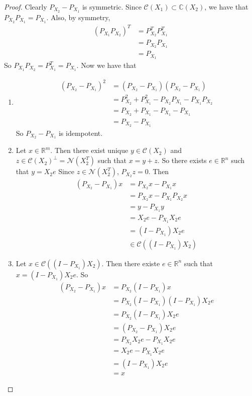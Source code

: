 \documentclass[12pt]{amsart}
\newcommand{\C}{\mathbb{C}}
\newcommand{\R}{\mathbb{R}}
\newcommand{\MC}{\mathcal{C}}
\newcommand{\MN}{\mathcal{N}}
\begin{document}
\begin{proof}
Clearly $P_{X_2} - P_{X_1}$ is symmetric. Since $\MC(X_1) \subset \C(X_2)$, we have that $P_{X_2}P_{X_1} = P_{X_1}$. Also, by symmetry, 
\begin{align*}
(P_{X_1}P_{X_2})^T 
&= P_{X_2}^TP_{X_1}^T \\
&= P_{X_2}P_{X_1} \\
&= P_{X_1} 
\end{align*} 
So $P_{X_1}P_{X_2} = P_{X_1}^T = P_{X_1}$. Now we have that
\begin{enumerate}
\item 
\begin{align*}
(P_{X_2} - P_{X_1})^2
&= (P_{X_2} - P_{X_1})(P_{X_2} - P_{X_1}) \\
&= P_{X_2}^2 + P_{X_1}^2 - P_{X_2}P_{X_1} - P_{X_1}P_{X_2} \\
&= P_{X_2} + P_{X_1} - P_{X_1} - P_{X_1} \\
&= P_{X_2} - P_{X_1}
\end{align*}
So $P_{X_2} - P_{X_1}$ is idempotent.
\item Let $x \in \R^m$. Then there exist unique $y \in \MC(X_2)$ and $z \in \MC(X_2)^{\perp} = \MN(X_2^T)$ such that $x = y+z$. So there exists $e \in \R^n$ such that $y = X_2e$ Since $z \in \MN(X_2^T)$, $P_{X_2}z = 0$. Then 
\begin{align*}
(P_{X_2} - P_{X_1})x
&= P_{X_2}x- P_{X_1}x \\
&= P_{X_2}x - P_{X_1}P_{X_2}x \\
&= y - P_{X_1}y \\
&= X_2e - P_{X_1}X_2e \\
&= (I - P_{X_1})X_2e \\
& \in \MC((I - P_{X_1})X_2)
\end{align*}
\item Let $x \in \MC((I - P_{X_1})X_2)$. Then there existe $e \in \R^n$ such that $x = (I - P_{X_1})X_2e$. So 
\begin{align*}
(P_{X_2} - P_{X_1})x
&= P_{X_2}(I - P_{X_1})x \\
&= P_{X_2}(I - P_{X_1})(I - P_{X_1})X_2e \\
&= P_{X_2}(I - P_{X_1})X_2e \\
&= (P_{X_2} - P_{X_1})X_2e \\
&= P_{X_2}X_2e - P_{X_1}X_2e \\
&= X_2e - P_{X_1}X_2e \\
&= (I-P_{X_1})X_2e \\
&= x
\end{align*}
\end{enumerate}
\end{proof}
\end{document}
